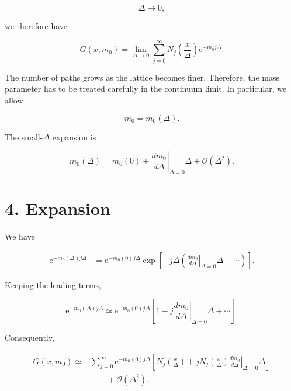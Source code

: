\documentclass[12pt,a4paper]{article}
\newcommand{\ee}{\mathrm{e}}
\begin{document}
\begin{equation}
    \Delta\rightarrow0,
\end{equation}

we therefore have

\begin{equation}
    G(x,m_0)
    =
    \lim_{\Delta\to0}
    \sum_{j=0}^{\infty}
    N_j\left(\frac{x}{\Delta}\right)
    \ee^{-m_0j\Delta}.
\end{equation}

The number of paths grows as the lattice becomes finer. Therefore,
the mass parameter has to be treated carefully in the continuum
limit. In particular, we allow

\begin{equation}
    m_0=m_0(\Delta).
\end{equation}

The small-$\Delta$ expansion is

\begin{equation}
    \boxed{
    m_0(\Delta)
    =
    m_0(0)
    +
    \left.
    \frac{dm_0}{d\Delta}
    \right|_{\Delta=0}\Delta
    +\mathcal{O}(\Delta^2)
    }.
\end{equation}


\section*{4. Expansion}

We have

\begin{align}
    \ee^{-m_0(\Delta)j\Delta}
    &=
    \ee^{-m_0(0)j\Delta}
    \exp\left[
        -j\Delta
        \left(
        \left.
        \frac{dm_0}{d\Delta}
        \right|_{\Delta=0}\Delta
        +\cdots
        \right)
    \right].
\end{align}

Keeping the leading terms,

\begin{equation}
    \ee^{-m_0(\Delta)j\Delta}
    \simeq
    \ee^{-m_0(0)j\Delta}
    \left[
        1
        -
        j
        \left.
        \frac{dm_0}{d\Delta}
        \right|_{\Delta=0}
        \Delta
        +\cdots
    \right].
\end{equation}

Consequently,

\begin{align}
G(x,m_0)
\simeq
&
\sum_{j=0}^{\infty}
\ee^{-m_0(0)j\Delta}
\left[
N_j\left(\frac{x}{\Delta}\right)
+
jN_j\left(\frac{x}{\Delta}\right)
\left.
\frac{dm_0}{d\Delta}
\right|_{\Delta=0}
\Delta
\right]
\\
&\qquad
+\mathcal{O}(\Delta^2).
\end{align}
\end{document}
